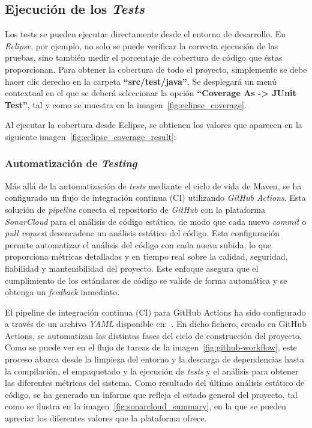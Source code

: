 \subsection{Ejecución de los \emph{Tests}}
Los tests se pueden ejecutar directamente desde el entorno de desarrollo. En \textit{Eclipse}, por ejemplo, no solo se puede verificar la correcta ejecución de las pruebas, sino también medir el porcentaje de cobertura de código que éstas proporcionan. Para obtener la cobertura de todo el proyecto, simplemente se debe hacer clic derecho en la carpeta \textbf{``src/test/java''}. Se desplegará un menú contextual en el que se deberá seleccionar la opción \textbf{``Coverage As -> JUnit Test''}, tal y como se muestra en la imagen~\ref{fig:eclipse_coverage}.


Al ejecutar la cobertura desde Eclipse, se obtienen los valores que aparecen en la siguiente imagen~\ref{fig:eclipse_coverage_result}:


\subsubsection{Automatización de \emph{Testing}}
Más allá de la automatización de \emph{tests} mediante el ciclo de vida de Maven, se ha configurado un flujo de integración continua (CI) utilizando \textit{GitHub Actions}. Esta solución de \emph{pipeline} conecta el repositorio de \textit{GitHub} con la plataforma \textit{SonarCloud} para el análisis de código estático, de modo que cada nuevo \emph{commit} o \emph{pull request} desencadene un análisis estático del código. Esta configuración permite automatizar el análisis del código con cada nueva subida, lo que proporciona métricas detalladas y en tiempo real sobre la calidad, seguridad, fiabilidad y mantenibilidad del proyecto. Este enfoque asegura que el cumplimiento de los estándares de código se valide de forma automática y se obtenga un \emph{feedback} inmediato.

El pipeline de integración continua (CI) para GitHub Actions ha sido configurado a través de un archivo \textit{YAML} disponible en:~\cite{github_action_ci}. En dicho fichero, creado en GitHub Actions, se automatizan las distintas fases del ciclo de construcción del proyecto. Como se puede ver en el flujo de tareas de la imagen~\ref{fig:github-workflow}, este proceso abarca desde la limpieza del entorno y la descarga de dependencias hasta la compilación, el empaquetado y la ejecución de \emph{tests} y el análisis para obtener las diferentes métricas del sistema. Como resultado del último análisis estático de código, se ha generado un informe que refleja el estado general del proyecto, tal como se ilustra en la imagen~\ref{fig:sonarcloud_summary}, en la que se pueden apreciar los diferentes valores que la plataforma ofrece.

